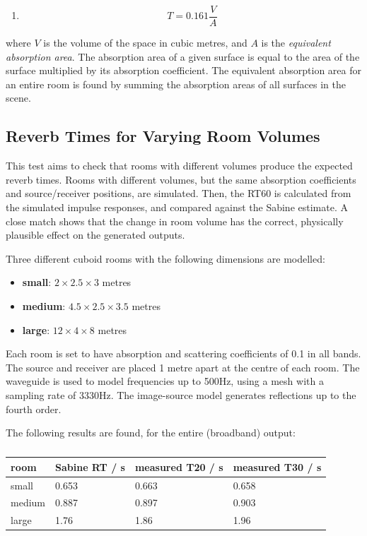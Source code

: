 \documentclass[]{scrreprt}
\providecommand{\tightlist}{%
  \setlength{\itemsep}{0pt}\setlength{\parskip}{0pt}}
\begin{document}
\begin{enumerate}
\def\labelenumi{(\arabic{enumi})}
\setcounter{enumi}{48}
\tightlist
\item
  \[T=0.161\frac{V}{A}\]
\end{enumerate}

where \(V\) is the volume of the space in cubic metres, and \(A\) is the
\emph{equivalent absorption area}. The absorption area of a given
surface is equal to the area of the surface multiplied by its absorption
coefficient. The equivalent absorption area for an entire room is found
by summing the absorption areas of all surfaces in the scene.

\subsection{Reverb Times for Varying Room
Volumes}\label{reverb-times-for-varying-room-volumes}

This test aims to check that rooms with different volumes produce the
expected reverb times. Rooms with different volumes, but the same
absorption coefficients and source/receiver positions, are simulated.
Then, the RT60 is calculated from the simulated impulse responses, and
compared against the Sabine estimate. A close match shows that the
change in room volume has the correct, physically plausible effect on
the generated outputs.

Three different cuboid rooms with the following dimensions are modelled:

\begin{itemize}
\tightlist
\item
  \textbf{small}: \(2 \times 2.5 \times 3\) metres
\item
  \textbf{medium}: \(4.5 \times 2.5 \times 3.5\) metres
\item
  \textbf{large}: \(12 \times 4 \times 8\) metres
\end{itemize}

Each room is set to have absorption and scattering coefficients of 0.1
in all bands. The source and receiver are placed 1 metre apart at the
centre of each room. The waveguide is used to model frequencies up to
500Hz, using a mesh with a sampling rate of 3330Hz. The image-source
model generates reflections up to the fourth order.

The following results are found, for the entire (broadband) output:

\begin{table}[ht]
\centering

\caption{}

\begin{tabular}{@{}llll@{}}
\toprule

room & Sabine RT / s & measured T20 / s & measured T30 / s \\\midrule

small & 0.653 & 0.663 & 0.658 \\
medium & 0.887 & 0.897 & 0.903 \\
large & 1.76 & 1.86 & 1.96 \\

\bottomrule
\end{tabular}

\end{table}
\end{document}
